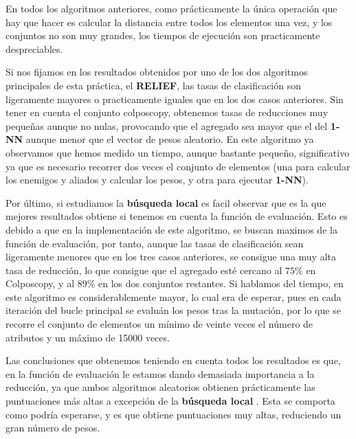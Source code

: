 \documentclass[size=a4, parskip=half, titlepage=false, toc=flat, toc=bib, 12pt]{scrartcl}
\begin{document}
En todos los algoritmos anteriores, como prácticamente la única operación que hay que hacer es calcular la distancia entre todos los elementos una vez, y los conjuntos no son muy grandes, los tiempos de ejecución son practicamente despreciables.

Si nos fijamos en los resultados obtenidos por uno de los dos algoritmos principales de esta práctica, el \textbf{RELIEF}, las tasas de clasificación son ligeramente mayores o practicamente iguales que en los dos casos anteriores. Sin tener en cuenta el conjunto colposcopy, obtenemos tasas de reducciones muy pequeñas aunque no nulas, provocando que el agregado sea mayor que el del \textbf{1-NN} aunque menor que el vector de pesos aleatorio. En este algoritmo ya observamos que hemos medido un tiempo, aunque bastante pequeño, significativo ya que es necesario recorrer dos veces el conjunto de elementos (una para calcular los enemigos y aliados y calcular los pesos, y otra para ejecutar \textbf{1-NN}).

Por último, si estudiamos la \textbf{búsqueda local} es facil observar que es la que mejores resultados obtiene si tenemos en cuenta la función de evaluación. Esto es debido a que en la implementación de este algoritmo, se buscan maximos de la función de evaluación, por tanto, aunque las tasas de clasificación sean ligeramente menores que en los tres casos anteriores, se consigue una muy alta tasa de reducción, lo que consigue que el agregado esté cercano al $75\%$ en Colposcopy, y al  $89\%$ en los dos conjuntos restantes. Si hablamos del tiempo, en este algoritmo es considerablemente mayor, lo cual era de esperar, pues en cada iteración del bucle principal se evaluán los pesos tras la mutación, por lo que se recorre el conjunto de elementos un mínimo de veinte veces el número de atributos y un máximo de 15000 veces.

Las conclusiones que obtenemos teniendo en cuenta todos los resultados es que, en la función de evaluación le estamos dando demasiada importancia a la reducción, ya que ambos algoritmos aleatorios obtienen prácticamente las puntuaciones más altas a excepción de la \textbf{búsqueda local}  . Esta se comporta como podría esperarse, y es que obtiene puntuaciones muy altas, reduciendo un gran número de pesos.
\end{document}
